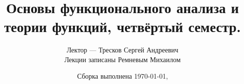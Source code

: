 \documentclass[12pt]{article}
\begin{document}
	\title{Основы функционального анализа и теории функций, четвёртый семестр.}
    \author
    {
		Лектор --- Тресков Сергей Андреевич\\
		Лекции записаны Ремневым Михаилом
    }
    \date{Сборка выполнена \today, \currenttime}
    \maketitle

    \tableofcontents %

	\pagebreak

    
    
    
    
\end{document}
